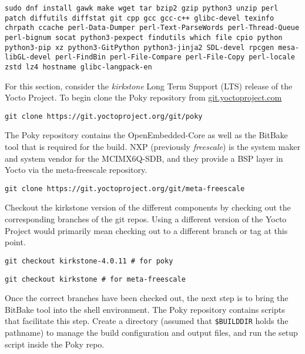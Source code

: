 \begin{verbatim}
sudo dnf install gawk make wget tar bzip2 gzip python3 unzip perl patch diffutils diffstat git cpp gcc gcc-c++ glibc-devel texinfo chrpath ccache perl-Data-Dumper perl-Text-ParseWords perl-Thread-Queue perl-bignum socat python3-pexpect findutils which file cpio python python3-pip xz python3-GitPython python3-jinja2 SDL-devel rpcgen mesa-libGL-devel perl-FindBin perl-File-Compare perl-File-Copy perl-locale zstd lz4 hostname glibc-langpack-en
\end{verbatim}

For this section, consider the \textit{kirkstone} Long Term Support (LTS) release of the Yocto Project. To begin clone the Poky repository from \href{https://git.yoctoproject.com}{git.yoctoproject.com}

\begin{verbatim}
git clone https://git.yoctoproject.org/git/poky
\end{verbatim}

The Poky repository contains the OpenEmbedded-Core as well as the BitBake tool that is required for the build. NXP (previously \textit{freescale}) is the system maker and system vendor for the MCIMX6Q-SDB, and they provide a BSP layer in Yocto via the meta-freescale repository.

\begin{verbatim}
git clone https://git.yoctoproject.org/git/meta-freescale
\end{verbatim}

Checkout the kirkstone version of the different components by checking out the corresponding branches of the git repos. Using a different version of the Yocto Project would primarily mean checking out to a different branch or tag at this point.

\begin{verbatim}
git checkout kirkstone-4.0.11 # for poky
\end{verbatim}

\begin{verbatim}
git checkout kirkstone # for meta-freescale
\end{verbatim}

Once the correct branches have been checked out, the next step is to bring the BitBake tool into the shell environment. The Poky repository contains scripts that facilitate this step. Create a directory (assumed that \texttt{\$BUILDDIR} holds the pathname) to manage the build configuration and output files, and run the setup script inside the Poky repo.

